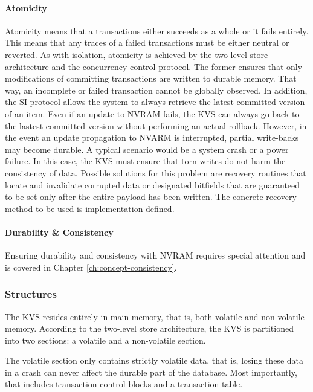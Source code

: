 \paragraph{Atomicity}

Atomicity means that a transactions either succeeds as a whole or it fails
entirely. This means that any traces of a failed transactions must be either
neutral or reverted. As with isolation, atomicity is achieved by the two-level
store architecture and the concurrency control protocol. The former ensures that
only modifications of committing transactions are written to durable memory.
That way, an incomplete or failed transaction cannot be globally observed. In
addition, the SI protocol allows the system to always retrieve the latest
committed version of an item. Even if an update to NVRAM fails, the KVS can
always go back to the lastest committed version without performing an actual
rollback. However, in the event an update propagation to NVARM is interrupted,
partial write-backs may become durable. A typical scenario would be a system
crash or a power failure. In this case, the KVS must ensure that torn writes
do not harm the consistency of data. Possible solutions for this problem are
recovery routines that locate and invalidate corrupted data or designated
bitfields that are guaranteed to be set only after the entire payload has been
written. The concrete recovery method to be used is implementation-defined.

\paragraph{Durability \& Consistency}

Ensuring durability and consistency with NVRAM requires special attention and is
covered in Chapter \ref{ch:concept-consistency}.

\subsubsection{Structures}

The KVS resides entirely in main memory, that is, both volatile and non-volatile
memory. According to the two-level store architecture, the KVS is partitioned
into two sections: a volatile and a non-volatile section.

The volatile section only contains strictly volatile data, that is, losing these
data in a crash can never affect the durable part of the database. Most
importantly, that includes transaction control blocks and a transaction table.

